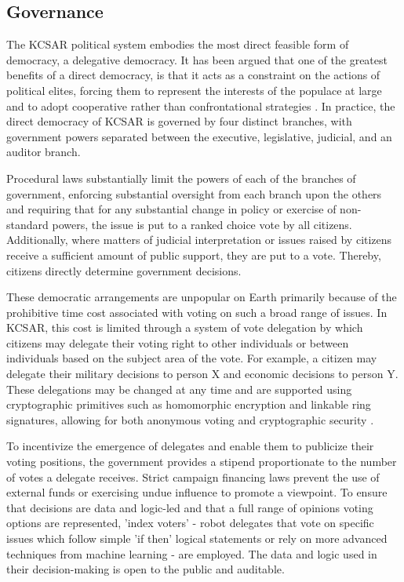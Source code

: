 \documentclass[fleqn,10pt]{Stylesheet} %
\begin{document}
\subsection{Governance}
The KCSAR political system embodies the most direct feasible form of democracy, a delegative democracy. It has been argued that one of the greatest benefits of a direct democracy, is that it acts as a constraint on the actions of political elites, forcing them to represent the interests of the populace at large and to adopt cooperative rather than confrontational strategies \cite{Papadopoulos2001}. In practice, the direct democracy of KCSAR is governed by four distinct branches, with government powers separated between the executive, legislative, judicial, and an auditor branch.

Procedural laws substantially limit the powers of each of the branches of government, enforcing substantial oversight from each branch upon the others and requiring that for any substantial change in policy or exercise of non-standard powers, the issue is put to a ranked choice vote by all citizens. Additionally, where matters of judicial interpretation or issues raised by citizens receive a sufficient amount of public support, they are put to a vote. Thereby, citizens directly determine government decisions.


These democratic arrangements are unpopular on Earth primarily because of the prohibitive time cost associated with voting on such a broad range of issues. In KCSAR, this cost is limited through a system of vote delegation by which citizens may delegate their voting right to other individuals or between individuals based on the subject area of the vote. For example, a citizen may delegate their military decisions to person X and economic decisions to person Y. These delegations may be changed at any time and are supported using cryptographic primitives such as homomorphic encryption and linkable ring signatures, allowing for both anonymous voting and cryptographic security \cite{Kaye}.

To incentivize the emergence of delegates and enable them to publicize their voting positions, the government provides a stipend proportionate to the number of votes a delegate receives. Strict campaign financing laws prevent the use of external funds or exercising undue influence to promote a viewpoint. To ensure that decisions are data and logic-led and that a full range of opinions voting options are represented, 'index voters' - robot delegates that vote on specific issues which follow simple 'if then' logical statements or rely on more advanced techniques from machine learning - are employed. The data and logic used in their decision-making is open to the public and auditable.
\end{document}
